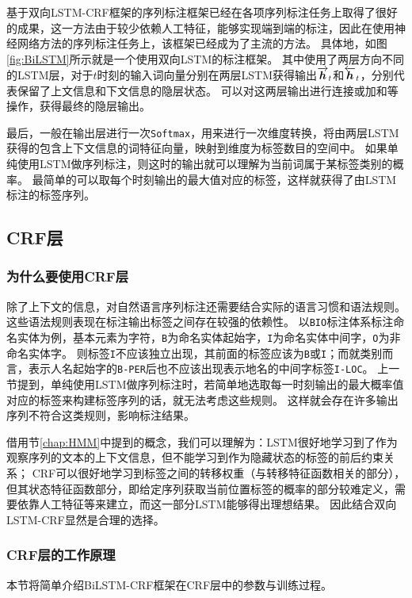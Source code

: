 基于双向LSTM-CRF框架的序列标注框架已经在各项序列标注任务上取得了很好的成果，这一方法由于较少依赖人工特征，能够实现端到端的标注，因此在使用神经网络方法的序列标注任务上，该框架已经成为了主流的方法。
具体地，如图\ref{fig:BiLSTM}所示就是一个使用双向LSTM的标注框架。
其中使用了两层方向不同的LSTM层，对于$t$时刻的输入词向量分别在两层LSTM获得输出$\overrightarrow{\boldsymbol{h}}_t$和$\overleftarrow{\boldsymbol{h}}_t$，分别代表保留了上文信息和下文信息的隐层状态。
可以对这两层输出进行连接或加和等操作，获得最终的隐层输出。

最后，一般在输出层进行一次\verb|Softmax|，用来进行一次维度转换，将由两层LSTM获得的包含上下文信息的词特征向量，映射到维度为标签数目的空间中。
如果单纯使用LSTM做序列标注，则这时的输出就可以理解为当前词属于某标签类别的概率。
最简单的可以取每个时刻输出的最大值对应的标签，这样就获得了由LSTM标注的标签序列。
\subsection{CRF层}
\subsubsection{为什么要使用CRF层}
除了上下文的信息，对自然语言序列标注还需要结合实际的语言习惯和语法规则。
这些语法规则表现在标注输出标签之间存在较强的依赖性。
以\verb|BIO|标注体系标注命名实体为例，基本元素为字符，\verb|B|为命名实体起始字，\verb|I|为命名实体中间字，\verb|O|为非命名实体字。
则标签\verb|I|不应该独立出现，其前面的标签应该为\verb|B|或\verb|I|；而就类别而言，表示人名起始字的\verb|B-PER|后也不应该出现表示地名的中间字标签\verb|I-LOC|。
上一节提到，单纯使用LSTM做序列标注时，若简单地选取每一时刻输出的最大概率值对应的标签来构建标签序列的话，就无法考虑这些规则。
这样就会存在许多输出序列不符合这类规则，影响标注结果。

借用节\ref{chap:HMM}中提到的概念，我们可以理解为：LSTM很好地学习到了作为观察序列的文本的上下文信息，但不能学习到作为隐藏状态的标签的前后约束关系；
CRF可以很好地学习到标签之间的转移权重（与转移特征函数相关的部分），但其状态特征函数部分，即给定序列获取当前位置标签的概率的部分较难定义，需要依靠人工特征等来建立，而这一部分LSTM能够得出理想结果。
因此结合双向LSTM-CRF显然是合理的选择。
\subsubsection{CRF层的工作原理}
本节将简单介绍BiLSTM-CRF框架在CRF层中的参数与训练过程。

